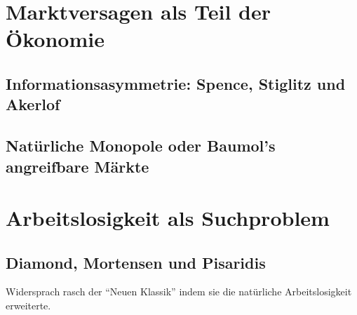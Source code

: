 \section{Marktversagen als Teil der Ökonomie}
\label{Marktversagen}

\subsection{Informationsasymmetrie: Spence, Stiglitz und Akerlof}


\subsection{Natürliche Monopole oder Baumol's angreifbare Märkte}


\section{Arbeitslosigkeit als Suchproblem}
\label{Suchtheorie}

\subsection{Diamond, Mortensen und Pisaridis}

Widersprach rasch der "`Neuen Klassik"' indem sie die natürliche Arbeitslosigkeit erweiterte.




